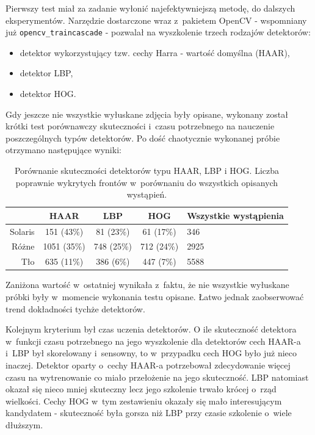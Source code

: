 Pierwszy test miał za zadanie wyłonić najefektywniejszą metodę, do dalszych
eksperymentów. Narzędzie dostarczone wraz z~pakietem OpenCV - wspomniany
już \verb|opencv_traincascade| - pozwalał na wyszkolenie trzech
rodzajów detektorów:

\begin{itemize}
    \item detektor wykorzystujący tzw. cechy Harra - wartość 
        domyślna (HAAR),
    \item detektor LBP,
    \item detektor HOG.
\end{itemize}

Gdy jeszcze nie wszystkie wyłuskane zdjęcia były opisane, wykonany został
krótki test porównawczy skuteczności i~czasu potrzebnego na nauczenie
poszczególnych typów detektorów. Po dość chaotycznie wykonanej próbie
otrzymano następujące wyniki:

\begin{table}[!h]
\centering
\begin{tabular}{r|c|c|c|l}
        & HAAR         & LBP        & HOG         & Wszystkie wystąpienia  \\
    \hline
Solaris & 151  (43\%)  & 81  (23\%) & 61 (17\%)   & 346  \\
Różne   & 1051 (35\%)  & 748 (25\%) & 712 (24\%)  & 2925 \\
Tło     & 635  (11\%)  & 386 (6\%)  & 447 (7\%)   & 5588 \\
\end{tabular}
\caption{Porównanie skuteczności detektorów typu HAAR, LBP i HOG.
Liczba poprawnie wykrytych frontów w~porównaniu do wszystkich opisanych
wystąpień.}
\label{tab:haar_lbp_hog_comparison}
\end{table}

Zaniżona wartość w~ostatniej wynikała z~faktu,
że nie wszystkie wyłuskane próbki były w~momencie wykonania testu opisane.
Łatwo jednak zaobserwować trend dokładności
tychże detektorów.

Kolejnym kryterium był czas uczenia detektorów.
O ile skuteczność detektora w~funkcji czasu potrzebnego na jego 
wyszkolenie dla detektorów cech HAAR-a i~LBP był skorelowany i~sensowny,
to w~przypadku cech HOG było już nieco inaczej.
Detektor oparty o~cechy HAAR-a potrzebował
zdecydowanie więcej czasu na wytrenowanie co miało przełożenie 
na jego skuteczność. LBP natomiast okazał się nieco mniej skuteczny
lecz jego szkolenie trwało krócej o~rząd wielkości.
Cechy HOG w~tym zestawieniu okazały się mało interesującym kandydatem
- skuteczność była gorsza niż LBP przy czasie szkolenie o~wiele dłuższym.

